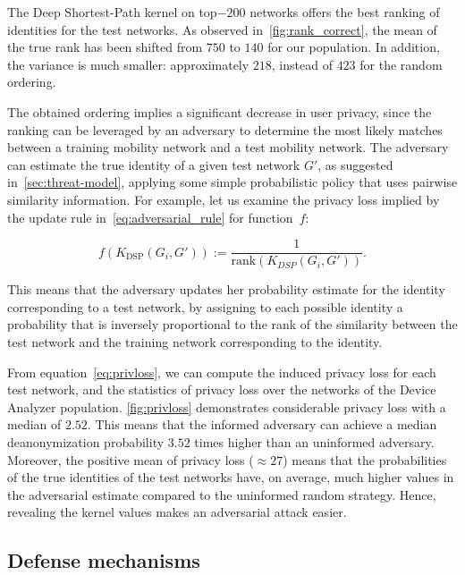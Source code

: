 The Deep Shortest-Path kernel on top$-200$ networks offers the best ranking of identities for the test networks.
As observed in~\cref{fig:rank_correct}, the mean of the true rank has been shifted from $ 750 $ to $ 140 $ for our population.
In addition, the variance is much smaller: approximately $ 218 $, instead of $ 423 $ for the random ordering.

The obtained ordering implies a significant decrease in user privacy, since the ranking can be leveraged by an adversary to determine the most likely matches between a training mobility network and a test mobility network.
The adversary can estimate the true identity of a given test network $ G' $, as suggested in~\cref{sec:threat-model}, applying some simple probabilistic policy that uses pairwise similarity information. For example, let us examine the privacy loss implied by the update rule in~\eqref{eq:adversarial_rule} for  \mbox{function $ f$}:

\[
f\left(K_{\text{DSP}}(G_i, G')\right) :=\frac{1}{\text{rank}\left(K_{DSP}(G_i, G')\right)}.
\label{eq:inverse_rank}
\]

This means that the adversary updates her probability estimate for the identity corresponding to a test network, by assigning to each possible identity a probability that is inversely proportional to the rank of the similarity between the test network and the training network corresponding to the identity.

From equation~\eqref{eq:privloss}, we can compute the induced privacy loss for each test network, and the statistics of privacy loss over the networks of the Device Analyzer population.
\cref{fig:privloss} demonstrates considerable privacy loss with a median of $ 2.52 $.
This means that the informed adversary can achieve a median deanonymization probability $3.52$ times higher than an uninformed adversary.
Moreover, the positive mean of privacy loss ($ {\approx  27}$) means that the probabilities of  the true identities of the test networks have, on average, much higher values in the adversarial estimate compared to the uninformed random strategy.
Hence, revealing the kernel values makes an adversarial attack easier.

\subsection{Defense mechanisms }

